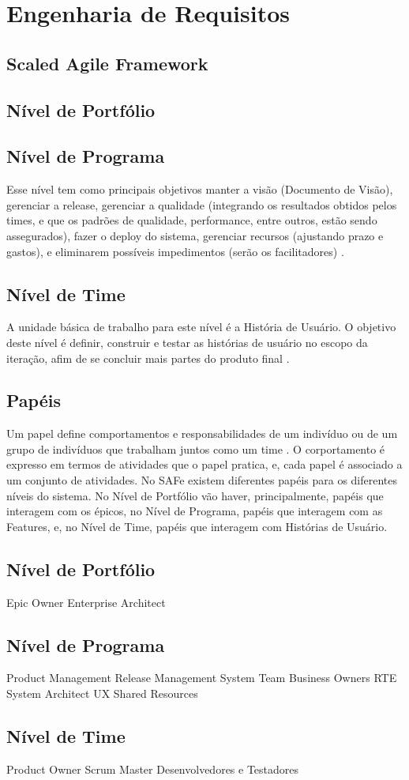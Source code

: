 \chapter[Engenharia de Requisitos]{Engenharia de Requisitos}

\section{Scaled Agile Framework}
\section{Nível de Portfólio}
\section{Nível de Programa}
Esse nível tem como principais objetivos manter a visão (Documento de Visão), gerenciar a release, gerenciar a qualidade (integrando os resultados obtidos pelos times, e que os padrões de qualidade, performance, entre outros, estão sendo assegurados), fazer o deploy do sistema, gerenciar recursos (ajustando prazo e gastos), e eliminarem possíveis impedimentos (serão os facilitadores) \cite{safe002}.



\section{Nível de Time}
A unidade básica de trabalho para este nível é a História de Usuário. O objetivo deste nível é definir, construir e testar as histórias de usuário no escopo da iteração, afim de se concluir mais partes do produto final \cite{safe001}.

\section{Papéis}
Um papel define comportamentos e responsabilidades de um indivíduo ou de um grupo de indivíduos que trabalham juntos como um time \cite{kruchten002}. O corportamento é expresso em termos de atividades que o papel pratica, e, cada papel é associado a um conjunto de atividades. No SAFe existem diferentes papéis para os diferentes níveis do sistema. No Nível de Portfólio vão haver, principalmente, papéis que interagem com os épicos, no Nível de Programa, papéis que interagem com as Features, e, no Nível de Time, papéis que interagem com Histórias de Usuário.
\section{Nível de Portfólio}
Epic Owner
Enterprise Architect
\section{Nível de Programa}
Product Management
Release Management
System Team
Business Owners
RTE
System Architect
UX
Shared Resources

\section{Nível de Time}
Product Owner
Scrum Master
Desenvolvedores e Testadores
